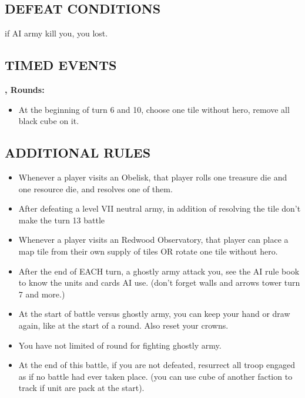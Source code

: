 \begin{multicols*}{2}
\subsection*{\MakeUppercase{Defeat Conditions}}

if AI army kill you, you lost.

\subsection*{\MakeUppercase{Timed Events}}

\textbf{,  Rounds:}
\begin{itemize}
  \item At the beginning of turn 6 and 10, choose one tile without hero, remove all black cube on it.
\end{itemize}

\subsection*{\MakeUppercase{Additional Rules}}
    \begin{itemize}
      \item Whenever a player visits an Obelisk, that player rolls one treasure die and one resource die, and resolves one of them.
      \item After defeating a level VII neutral army, in addition of resolving the tile don't make the turn 13 battle
      \item Whenever a player visits an Redwood Observatory, that player can place a map tile from their own supply of tiles OR rotate one tile without hero.
      \item After the end of EACH turn, a ghostly army attack you, see the AI rule book to know the units and cards AI use. (don't forget walls
      and arrows tower turn 7 and more.)
      \item At the start of battle versus ghostly army, you can keep your hand or draw again, like at the start of a round. Also reset your crowns.
      \item You have not limited of round for fighting ghostly army.
      \item At the end of this battle, if you are not defeated, resurrect all troop engaged as if no battle had ever taken place. (you can use cube of another faction to track if unit are pack at the start).
    \end{itemize}
\end{multicols*}